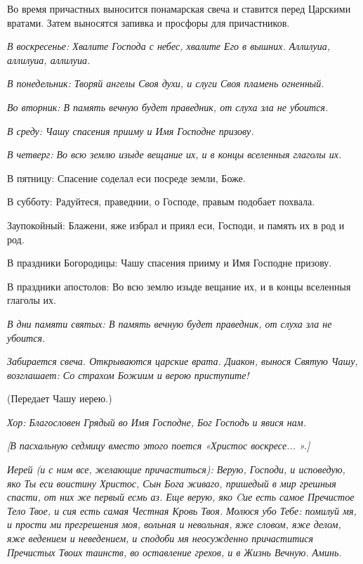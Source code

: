 

      Во время причастных выносится понамарская свеча и ставится перед Царскими вратами. Затем выносятся запивка и просфоры для причастников.


\itshape  В воскресенье:\normalfont{} Хвалите Господа с небес, хвалите Его в вышних. Аллилуиа, аллилуиа, аллилуиа. 


\itshape В понедельник:\normalfont{} Творяй ангелы Своя духи, и слуги Своя пламень огненный. 


\itshape Во вторник:\normalfont{} В память вечную будет праведник, от слуха зла не убоится. 


\itshape В среду:\normalfont{} Чашу спасения прииму и Имя Господне призову. 


\itshape В четверг:\normalfont{} Во всю землю изыде вещание их, и в концы вселенныя глаголы их. \itshape 


  В пятницу:\normalfont{} Спасение соделал еси посреде земли, Боже. \itshape 


  В субботу:\normalfont{} Радуйтеся, праведнии, о Господе, правым подобает похвала. \itshape 


  Заупокойный:\normalfont{} Блажени, яже избрал и приял еси, Господи, и память их в род и род. \itshape 


  В праздники Богородицы:\normalfont{} Чашу спасения прииму и Имя Господне призову. \itshape 


  В праздники апостолов:\normalfont{} Во всю землю изыде вещание их, и в концы вселенныя глаголы их. 


\itshape В дни памяти святых:\normalfont{} В память вечную будет праведник, от слуха зла не убоится. 


\itshape   Забирается свеча\normalfont{}. \itshape  Открываются царские врата. Диакон, вынося Святую Чашу, возглашает: Со страхом Божиим и верою приступите! 


  (Передает Чашу иерею.) \normalfont{}


\itshape Хор:\normalfont{} Благословен Грядый во Имя Господне, Бог Господь и явися нам.


\itshape [В пасхальную седмицу вместо этого поется «Христос воскресе... ».]\normalfont{}


\itshape  Иерей (и с ним все, желающие причаститься):\normalfont{} Верую, Господи, и исповедую, яко Ты еси воистину Христос, Сын Бога живаго, пришедый в мир грешныя спасти, от них же первый есмь аз. Еще верую, яко Cие есть самое Пречистое Тело Твое, и сия есть самая Честная Кровь Твоя. Молюся убо Тебе: помилуй мя, и прости ми прегрешения моя, вольная и невольная, яже словом, яже делом, яже ведением и неведением, и сподоби мя неосужденно причаститися Пречистых Твоих таинств, во оставление грехов, и в Жизнь Вечную. Аминь.


